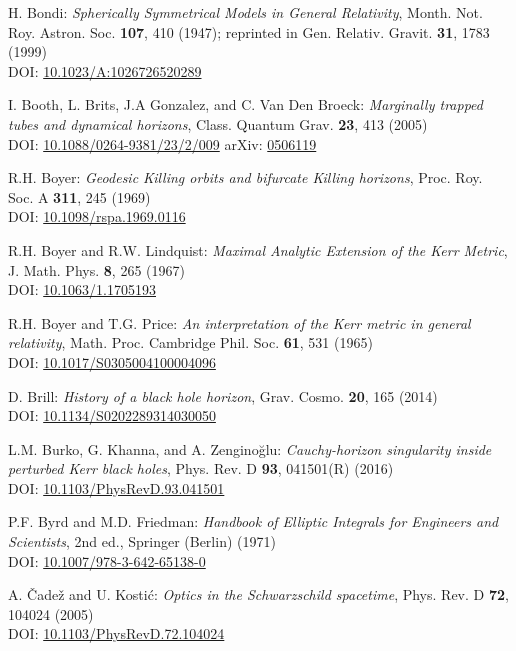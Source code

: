 \begin{thebibliography}{123}
H. Bondi:
{\em Spherically Symmetrical Models in General Relativity},
Month. Not. Roy. Astron. Soc. {\bf 107}, 410 (1947);
reprinted in
Gen. Relativ. Gravit. {\bf 31}, 1783 (1999)\\
DOI: \href{https://doi.org/10.1023/A:1026726520289}{10.1023/A:1026726520289}

I. Booth, L. Brits, J.A Gonzalez, and C. Van Den Broeck:
{\em Marginally trapped tubes and dynamical horizons},
Class. Quantum Grav. {\bf 23}, 413 (2005)\\
DOI: \href{https://doi.org/10.1088/0264-9381/23/2/009}{10.1088/0264-9381/23/2/009}\hfill
arXiv: \href{https://arxiv.org/abs/gr-qc/0506119}{0506119}

R.H. Boyer: {\em Geodesic Killing orbits and bifurcate Killing horizons},
Proc. Roy. Soc. A {\bf 311}, 245 (1969)\\
DOI: \href{https://doi.org/10.1098/rspa.1969.0116}{10.1098/rspa.1969.0116}

R.H. Boyer and R.W. Lindquist: {\em Maximal Analytic Extension of the Kerr Metric},
J. Math. Phys. {\bf 8}, 265 (1967)\\
DOI: \href{https://doi.org/10.1063/1.1705193}{10.1063/1.1705193}

R.H. Boyer and T.G. Price: {\em An interpretation of the Kerr metric in general relativity},
Math. Proc. Cambridge Phil. Soc. {\bf 61}, 531 (1965)\\
DOI: \href{https://doi.org/10.1017/S0305004100004096}{10.1017/S0305004100004096}

D. Brill: {\em History of a black hole horizon},
Grav. Cosmo. {\bf 20}, 165 (2014) \\
DOI: \href{https://doi.org/10.1134/S0202289314030050}{10.1134/S0202289314030050}

L.M. Burko, G. Khanna, and A. Zenginoğlu: {\em
Cauchy-horizon singularity inside perturbed Kerr black holes},
Phys. Rev. D {\bf 93}, 041501(R) (2016) \\
DOI: \href{https://doi.org/10.1103/PhysRevD.93.041501}{10.1103/PhysRevD.93.041501}

P.F. Byrd and M.D. Friedman:
{\em Handbook of Elliptic Integrals for Engineers and Scientists},
2nd ed., Springer (Berlin) (1971)\\
DOI: \href{https://doi.org/10.1007/978-3-642-65138-0}{10.1007/978-3-642-65138-0}

A. \v{C}ade\v{z} and U. Kosti\'c:
{\em Optics in the Schwarzschild spacetime},
Phys. Rev. D {\bf 72}, 104024 (2005)\\
DOI: \href{https://doi.org/10.1103/PhysRevD.72.104024}{10.1103/PhysRevD.72.104024}


\end{thebibliography}
